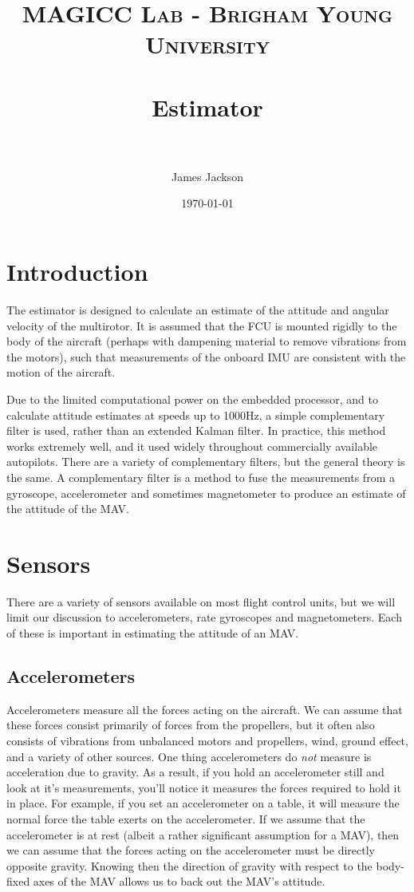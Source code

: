\documentclass[paper=a4, fontsize=11pt]{scrartcl} %
\title{
\normalfont \normalsize
\textsc{MAGICC Lab - Brigham Young University} \\ [25pt] %
\horrule{0.5pt} \\[0.4cm] %
\huge Estimator \\ %
\horrule{2pt} \\[0.5cm] %
}
\author{James Jackson} %
\date{\normalsize\today} %
\numberwithin{equation}{section} %
\numberwithin{figure}{section} %
\numberwithin{table}{section} %
\begin{document}
\maketitle %


\section{Introduction}

The estimator is designed to calculate an estimate of the attitude and angular velocity of the multirotor.  It is assumed that the FCU is mounted rigidly to the body of the aircraft (perhaps with dampening material to remove vibrations from the motors), such that measurements of the onboard IMU are consistent with the motion of the aircraft.

Due to the limited computational power on the embedded processor, and to calculate attitude estimates at speeds up to 1000Hz, a simple complementary filter is used, rather than an extended Kalman filter.  In practice, this method works extremely well, and it used widely throughout commercially available autopilots.  There are a variety of complementary filters, but the general theory is the same.  A complementary filter is a method to fuse the measurements from a gyroscope, accelerometer and sometimes magnetometer to produce an estimate of the attitude of the MAV.

\section{Sensors}
There are a variety of sensors available on most flight control units, but we will limit our discussion to accelerometers, rate gyroscopes and magnetometers.  Each of these is important in estimating the attitude of an MAV.

\subsection{Accelerometers}

Accelerometers measure all the forces acting on the aircraft.  We can assume that these forces consist primarily of forces from the propellers, but it often also consists of vibrations from unbalanced motors and propellers, wind, ground effect, and a variety of other sources. One thing accelerometers do \textit{not} measure is acceleration due to gravity.  As a result, if you hold an accelerometer still and look at it's measurements, you'll notice it measures the forces required to hold it in place.  For example, if you set an accelerometer on a table, it will measure the normal force the table exerts on the accelerometer.  If we assume that the accelerometer is at rest (albeit a rather significant assumption for a MAV), then we can assume that the forces acting on the accelerometer must be directly opposite gravity.  Knowing then the direction of gravity with respect to the body-fixed axes of the MAV allows us to back out the MAV's attitude.  
\end{document}
